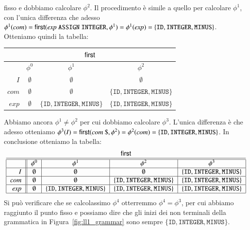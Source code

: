 fisso e dobbiamo calcolare $\phi^2$. Il procedimento \`e simile a quello
per calcolare $\phi^1$, con l'unica differenza che adesso
$\phi^1(\mathit{com})=
\mathsf{first}(\mathit{exp}\ \mathtt{ASSIGN}\ \mathtt{INTEGER},\phi^1)=
\phi^1(\mathit{exp})=\{\mathtt{ID},\mathtt{INTEGER},\mathtt{MINUS}\}$.
Otteniamo quindi la tabella:
%
\begin{center}
\begin{tabular}{|r||c|c|c|}
\multicolumn{4}{c}{$\mathsf{first}$}\\\hline\hline
 & $\phi^0$ & $\phi^1$ & $\phi^2$ \\\hline
$I$ & $\emptyset$ & $\emptyset$ & $\emptyset$ \\\hline
$\mathit{com}$ & $\emptyset$ & $\emptyset$ & $\{\mathtt{ID},\mathtt{INTEGER},\mathtt{MINUS}\}$\\\hline
$\mathit{exp}$ & $\emptyset$ & $\{\mathtt{ID},\mathtt{INTEGER},
  \mathtt{MINUS}\}$ & $\{\mathtt{ID},\mathtt{INTEGER},\mathtt{MINUS}\}$\\\hline
\end{tabular}
\end{center}
%
Abbiamo ancora $\phi^1\not=\phi^2$ per cui dobbiamo calcolare
$\phi^3$. L'unica differenza \`e che adesso otteniamo
$\phi^3(\mathit{I})=\first(\mathit{com}\ \mathtt{\$},\phi^2)
=\phi^2(\mathit{com})=\{\mathtt{ID},\mathtt{INTEGER},\mathtt{MINUS}\}$.
In conclusione otteniamo la tabella:
%
\begin{equation}\label{tab:first_ll1_grammar}
\mbox{
\begin{tabular}{|r||c|c|c|c|}
\multicolumn{5}{c}{$\first$}\\\hline\hline
 & $\phi^0$ & $\phi^1$ & $\phi^2$ & $\phi^3$ \\\hline
$I$ & $\emptyset$ & $\emptyset$ & $\emptyset$ & $\{\mathtt{ID},\mathtt{INTEGER},\mathtt{MINUS}\}$\\\hline
$\mathit{com}$ & $\emptyset$ & $\emptyset$ & $\{\mathtt{ID},\mathtt{INTEGER},\mathtt{MINUS}\}$ & $\{\mathtt{ID},\mathtt{INTEGER},\mathtt{MINUS}\}$\\\hline
$\mathit{exp}$ & $\emptyset$ & $\{\mathtt{ID},\mathtt{INTEGER},
  \mathtt{MINUS}\}$ & $\{\mathtt{ID},\mathtt{INTEGER},\mathtt{MINUS}\}$ &
  $\{\mathtt{ID},\mathtt{INTEGER},\mathtt{MINUS}\}$\\\hline
\end{tabular}
}
\end{equation}
%
Si pu\`o verificare che se calcolassimo $\phi^4$ otterremmo
$\phi^4=\phi^3$, per cui abbiamo raggiunto il punto fisso e possiamo dire
che gli inizi dei non terminali della grammatica in
Figura~\ref{fig:ll1_grammar} sono sempre $\{\mathtt{ID},\mathtt{INTEGER},
\mathtt{MINUS}\}$.
%

